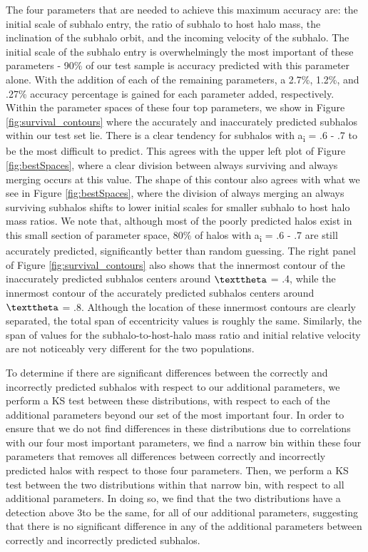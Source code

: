 \documentclass[fleqn,usenatbib]{mnras}
\begin{document}
The four parameters that are needed to achieve this maximum accuracy are: the initial scale of subhalo entry, the ratio of subhalo to host halo mass, the inclination of the subhalo orbit, and the incoming velocity of the subhalo. The initial scale of the subhalo entry is overwhelmingly the most important of these parameters - 90\% of our test sample is accuracy predicted with this parameter alone. With the addition of each of the remaining parameters, a 2.7\%, 1.2\%, and .27\% accuracy percentage is gained for each parameter added, respectively. Within the parameter spaces of these four top parameters, we show in Figure \ref{fig:survival_contours} where the accurately and inaccurately predicted subhalos within our test set lie. There is a clear tendency for subhalos with a\textsubscript{i} =  .6 - .7 to be the most difficult to predict. This agrees with the upper left plot of Figure \ref{fig:bestSpaces}, where a clear division between always surviving and always merging occurs at this value. The shape of this contour also agrees with what we see in Figure \ref{fig:bestSpaces}, where the division of always merging an always surviving subhalos shifts to lower initial scales for smaller subhalo to host halo mass ratios. We note that, although most of the poorly predicted halos exist in this small section of parameter space, 80\% of halos with a\textsubscript{i} =  .6 - .7 are still accurately predicted, significantly better than random guessing. The right panel of Figure \ref{fig:survival_contours} also shows that the innermost contour of the inaccurately predicted subhalos centers around $\texttheta$ = .4, while the innermost contour of the accurately predicted subhalos centers around $\texttheta$ = .8. Although the location of these innermost contours are clearly separated, the total span of eccentricity values is roughly the same. Similarly, the span of values for the subhalo-to-host-halo mass ratio and initial relative velocity are not noticeably very different for the two populations.

To determine if there are significant differences between the correctly and incorrectly predicted subhalos with respect to our additional parameters, we perform a KS test between these distributions, with respect to each of the additional parameters beyond our set of the most important four. In order to ensure that we do not find differences in these distributions due to correlations with our four most important parameters, we find a narrow bin within these four parameters that removes all differences between correctly and incorrectly predicted halos with respect to those four parameters. Then, we perform a KS test between the two distributions within that narrow bin, with respect to all additional parameters. In doing so, we find that the two distributions have a detection above 3\textsigma to be the same, for all of our additional parameters, suggesting that there is no significant difference in any of the additional parameters between correctly and incorrectly predicted subhalos.
\end{document}
